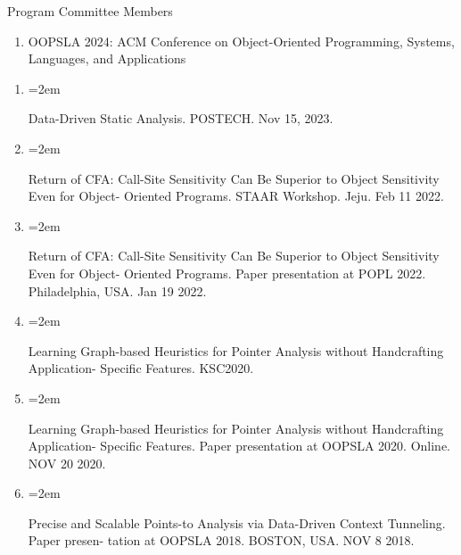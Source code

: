 \documentclass{scrartcl}
\newcommand{\Description}[1]{\hangindent=2em\hangafter=0\noindent\raggedright\footnotesize{#1}\par\normalsize\vspace{1em}} %
\begin{document}
\begin{cv}{}

\vspace{1em} %
\vspace{1em}

Program Committee Members

\begin{enumerate}
    \item OOPSLA 2024: ACM Conference on Object-Oriented Programming, Systems, Languages, and Applications
\end{enumerate}






\vspace{1em}

\begin{enumerate}

\item{\Description{Data-Driven Static Analysis. POSTECH. Nov 15, 2023.}}

\item{\Description{Return of CFA: Call-Site Sensitivity Can Be Superior to Object Sensitivity Even for Object- Oriented Programs. STAAR Workshop. Jeju. Feb 11 2022.}}

\item{\Description{Return of CFA: Call-Site Sensitivity Can Be Superior to Object Sensitivity Even for Object- Oriented Programs. Paper presentation at POPL 2022. Philadelphia, USA. Jan 19 2022.}}

\item{\Description{Learning Graph-based Heuristics for Pointer Analysis without Handcrafting Application- Specific Features. KSC2020.}}

\item{\Description{Learning Graph-based Heuristics for Pointer Analysis without Handcrafting Application- Specific Features. Paper presentation at OOPSLA 2020. Online. NOV 20 2020.}}

\item{\Description{Precise and Scalable Points-to Analysis via Data-Driven Context Tunneling. Paper presen- tation at OOPSLA 2018. BOSTON, USA. NOV 8 2018.}}


\end{enumerate}
\end{cv}
\end{document}
